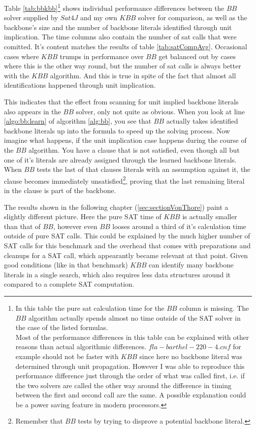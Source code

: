 Table \ref{tab:bbkbb}\footnote{
	In this table the pure sat calculation time for the $BB$ column is missing. The $BB$ algorithm actually spends almost no time outside of the SAT solver in the case of the listed formulas.\\
	Most of the performance differences in this table can be explained with other reasons than actual algorithmic differences. $fla-barthel-220-4.cnf$ for example should not be faster with $KBB$ since here no backbone literal was determined through unit propagation. However I was able to reproduce this performance difference just through the order of what was called first, i.e. if the two solvers are called the other way around the difference in timing between the first and second call are the same. A possible explanation could be a power saving feature in modern processors.
	} 
shows individual performance differences between the $BB$ solver supplied by $Sat4J$ and my own $KBB$ solver for comparison, as well as the backbone's size and the number of backbone literals identified through unit implication. The time columns also contain the number of sat calls that were comitted. It's content matches the results of table \ref{tab:satCompAvg}. Occasional cases where $KBB$ trumps in performance over $BB$ get balanced out by cases where this is the other way round, but the number of sat calls is always better with the $KBB$ algorithm. And this is true in spite of the fact that almost all identifications happened through unit implication. 

This indicates that the effect from scanning for unit implied backbone literals also appears in the $BB$ solver, only not quite as obvious. When you look at line \ref{algo:bb:learn} of algorithm \ref{alg:bb}, you see that $BB$ actually takes identified backbone literals up into the formula to speed up the solving process. Now imagine what happens, if the unit implication case happens during the course of the $BB$ algorithm. You have a clause that is not satisfied, even though all but one of it's literals are already assigned through the learned backbone literals. When $BB$ tests the last of that clauses literals with an assumption against it, the clause becomes immediately unsatisfied\footnote{Remember that $BB$ tests by trying to disprove a potential backbone literal.}, proving that the last remaining literal in the clause is part of the backbone. 

The results shown in the following chapter (\ref{sec:sectionVonThore}) paint a slightly different picture. Here the pure SAT time of $KBB$ is actually smaller than that of $BB$, however even $BB$ looses around a third of it's calculation time outside of pure SAT calls. This could be explained by the much higher number of SAT calls for this benchmark and the overhead that comes with preparations and cleanups for a SAT call, which appearantly became relevant at that point. Given good conditions (like in that benchmark) $KBB$ can identify many backbone literals in a single search, which also requires less data structures around it compared to a complete SAT computation.

